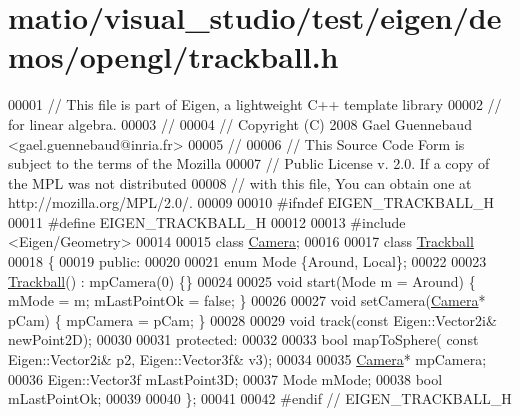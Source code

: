 \hypertarget{matio_2visual__studio_2test_2eigen_2demos_2opengl_2trackball_8h_source}{}\section{matio/visual\+\_\+studio/test/eigen/demos/opengl/trackball.h}
\label{matio_2visual__studio_2test_2eigen_2demos_2opengl_2trackball_8h_source}

\begin{DoxyCode}
00001 \textcolor{comment}{// This file is part of Eigen, a lightweight C++ template library}
00002 \textcolor{comment}{// for linear algebra.}
00003 \textcolor{comment}{//}
00004 \textcolor{comment}{// Copyright (C) 2008 Gael Guennebaud <gael.guennebaud@inria.fr>}
00005 \textcolor{comment}{//}
00006 \textcolor{comment}{// This Source Code Form is subject to the terms of the Mozilla}
00007 \textcolor{comment}{// Public License v. 2.0. If a copy of the MPL was not distributed}
00008 \textcolor{comment}{// with this file, You can obtain one at http://mozilla.org/MPL/2.0/.}
00009 
00010 \textcolor{preprocessor}{#ifndef EIGEN\_TRACKBALL\_H}
00011 \textcolor{preprocessor}{#define EIGEN\_TRACKBALL\_H}
00012 
00013 \textcolor{preprocessor}{#include <Eigen/Geometry>}
00014 
00015 \textcolor{keyword}{class }\hyperlink{class_camera}{Camera};
00016 
00017 \textcolor{keyword}{class }\hyperlink{class_trackball}{Trackball}
00018 \{
00019   \textcolor{keyword}{public}:
00020 
00021     \textcolor{keyword}{enum} Mode \{Around, Local\};
00022 
00023     \hyperlink{class_trackball}{Trackball}() : mpCamera(0) \{\}
00024 
00025     \textcolor{keywordtype}{void} start(Mode m = Around) \{ mMode = m; mLastPointOk = \textcolor{keyword}{false}; \}
00026 
00027     \textcolor{keywordtype}{void} setCamera(\hyperlink{class_camera}{Camera}* pCam) \{ mpCamera = pCam; \}
00028 
00029     \textcolor{keywordtype}{void} track(\textcolor{keyword}{const} Eigen::Vector2i& newPoint2D);
00030 
00031   \textcolor{keyword}{protected}:
00032 
00033     \textcolor{keywordtype}{bool} mapToSphere( \textcolor{keyword}{const} Eigen::Vector2i& p2, Eigen::Vector3f& v3);
00034 
00035     \hyperlink{class_camera}{Camera}* mpCamera;
00036     Eigen::Vector3f mLastPoint3D;
00037     Mode mMode;
00038     \textcolor{keywordtype}{bool} mLastPointOk;
00039 
00040 \};
00041 
00042 \textcolor{preprocessor}{#endif // EIGEN\_TRACKBALL\_H}
\end{DoxyCode}
